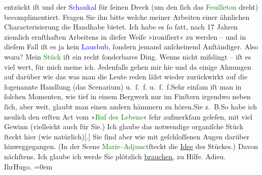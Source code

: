                entzückt iſt und der \textcolor{blue}{Schaukal}{}\ledrightnote{\textcolor{blue}{Richard von Schaukal}} für ſeinen Dreck (um
               den ſich das \textcolor{green}{Feuilleton}{} dreht)
               becomplimentiert. Fragen Sie ihn bitte welche meiner Arbeiten einer ähnlichen
               Characterisierung die Handhabe bietet.\pend
           \pstart
           Ich habe es ſo ſatt, nach 17 Jahren ziemlich ernſthaften Arbeitens in dieſer Weiſe
               »ironiſiert« zu werden – und in dieſem Fall iſt es ja kein \textcolor{blue}{Lausbub}{}, ſondern jemand
               anſcheinend Anſtändiger. Also wozu?\pend
           \pstart
           {\pb}Mein \textcolor{green}{Stück}{} iſt ein recht ſonderbares Ding. Wenns
               nicht miſslingt – iſt es viel wert, für mich meine ich. Jedenfalls gehen mir hie und
               da einige Ahnungen auf darüber wie das was man die Leute reden läſst wieder
               zurückwirkt auf die ſogenannte Handlung (das Scenarium) u. ſ. f.
                  u. ſ. f.\hspace*{1.5em}Sehr einſam iſt man in ſolchen
               Momenten, wie tief in einem Bergwerk nur im Finſtern {\pb}irgendwo neben ſich, aber weit,
               glaubt man einen andern hämmern zu hören.\hspace*{1.5em}Sie
                  z. B.\hspace*{1.5em}So habe ich neulich den erſten Act vom »\textcolor{green}{Ruf des Lebens}{}\ledrightnote{\textcolor{green}{Der Ruf des Lebens. Schauspiel in drei Akten}}« ſehr aufmerkſam geleſen, mit viel
               Gewinn (vielleicht auch für Sie.) Ich glaube das notwendige organiſche Stück ſteckt
               hier (wie natürlich){[}.{]} Sie ſind aber wie mit geſchloſſenen Augen
               darüber hinweggegangen. (In der Scene \textcolor{green}{Marie}{}–\textcolor{green}{Adjunct}{}ſteckt die \uline{Idee} des
               Stückes.) Davon nächſtens.\pend
           \pstart
           Ich glaube ich werde Sie plötzlich \uline{brauchen}, zu
               Hilfe.\pend
           \pstart
           Adieu.{\\[\baselineskip]}Ihr\spacefill\mbox{Hugo.}\pend
           \leftskip=0em{}\pstart
           \noindent{}\label{T_L01727_1v}\label{T_L01727_1h}\pend
           \endnumbering{}  
      